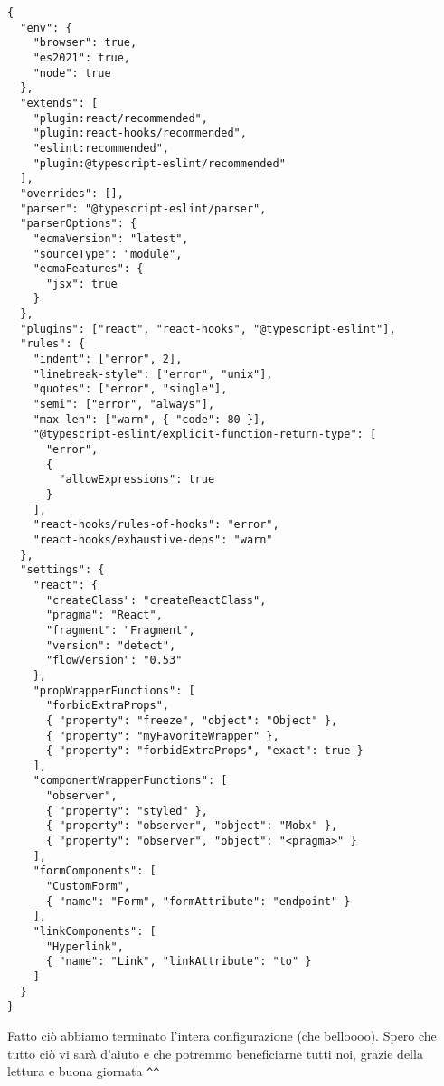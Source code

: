 \begin{verbatim}
{
  "env": {
    "browser": true,
    "es2021": true,
    "node": true
  },
  "extends": [
    "plugin:react/recommended",
    "plugin:react-hooks/recommended",
    "eslint:recommended",
    "plugin:@typescript-eslint/recommended"
  ],
  "overrides": [],
  "parser": "@typescript-eslint/parser",
  "parserOptions": {
    "ecmaVersion": "latest",
    "sourceType": "module",
    "ecmaFeatures": {
      "jsx": true
    }
  },
  "plugins": ["react", "react-hooks", "@typescript-eslint"],
  "rules": {
    "indent": ["error", 2],
    "linebreak-style": ["error", "unix"],
    "quotes": ["error", "single"],
    "semi": ["error", "always"],
    "max-len": ["warn", { "code": 80 }],
    "@typescript-eslint/explicit-function-return-type": [
      "error",
      {
        "allowExpressions": true
      }
    ],
    "react-hooks/rules-of-hooks": "error",
    "react-hooks/exhaustive-deps": "warn"
  },
  "settings": {
    "react": {
      "createClass": "createReactClass",
      "pragma": "React",
      "fragment": "Fragment",
      "version": "detect",
      "flowVersion": "0.53"
    },
    "propWrapperFunctions": [
      "forbidExtraProps",
      { "property": "freeze", "object": "Object" },
      { "property": "myFavoriteWrapper" },
      { "property": "forbidExtraProps", "exact": true }
    ],
    "componentWrapperFunctions": [
      "observer",
      { "property": "styled" },
      { "property": "observer", "object": "Mobx" },
      { "property": "observer", "object": "<pragma>" }
    ],
    "formComponents": [
      "CustomForm",
      { "name": "Form", "formAttribute": "endpoint" }
    ],
    "linkComponents": [
      "Hyperlink",
      { "name": "Link", "linkAttribute": "to" }
    ]
  }
}
\end{verbatim}

Fatto ciò abbiamo terminato l'intera configurazione (che belloooo). Spero che tutto ciò vi sarà d'aiuto e che potremmo beneficiarne tutti noi, grazie della lettura e buona giornata \verb|^^|
